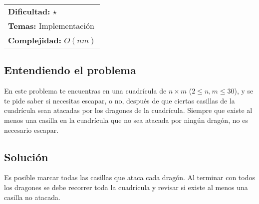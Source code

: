 \hfill
\begin{tabular}{@{}l@{}}
\textbf{Dificultad:} $\star$\\
\textbf{Temas:} Implementación\\
\textbf{Complejidad:} $O(nm)$
\end{tabular}

\subsection*{Entendiendo el problema}
En este problema te encuentras en una cuadrícula de $n \times m$ ($2 \leq n, m \leq 30$), y se te pide saber si necesitas escapar, o no, después de que ciertas casillas de la cuadrícula sean atacadas por los dragones de la cuadrícula. Siempre que existe al menos una casilla en la cuadrícula que no sea atacada por ningún dragón, no es necesario escapar.

\subsection*{Solución}
Es posible marcar todas las casillas que ataca cada dragón. Al terminar con todos los dragones se debe recorrer toda la cuadrícula y revisar si existe al menos una casilla no atacada.
